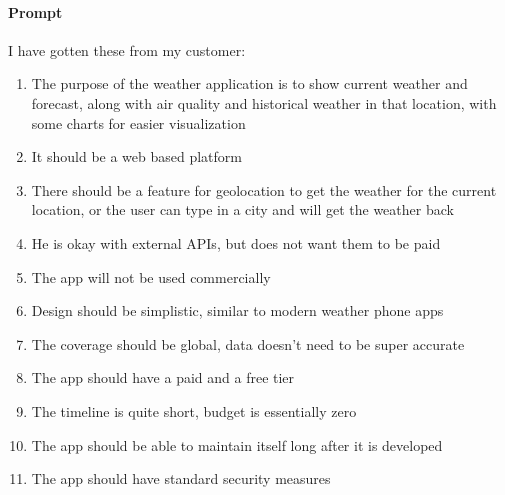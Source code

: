 \documentclass[FM,DP]{tulthesis}
\begin{document}
		\begin{tcolorbox}[colback=white,colframe=black]
			\paragraph{Prompt} 
			I have gotten these from my customer: 
			\begin{enumerate}
				\item The purpose of the weather application is to show current weather and forecast, along with air quality and historical weather in that location, with some charts for easier visualization
				\item It should be a web based platform 
				\item There should be a feature for geolocation to get the weather for the current location, or the user can type in a city and will get the weather back 
				\item He is okay with external APIs, but does not want them to be paid 
				\item The app will not be used commercially 
				\item Design should be simplistic, similar to modern weather phone apps 
				\item The coverage should be global, data doesn't need to be super accurate 
				\item The app should have a paid and a free tier 
				\item The timeline is quite short, budget is essentially zero 
				\item The app should be able to maintain itself long after it is developed 
				\item The app should have standard security measures
			\end{enumerate}
			

\end{tcolorbox}
\end{document}
